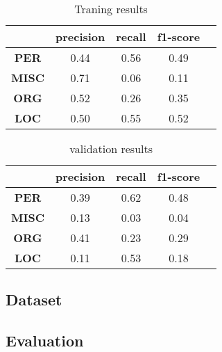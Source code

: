 \begin{table}[ht]
  \centering
  \begin{tabular}{|c|c|c|c|c|}
    \hline
    \textbf{}     & \textbf{precision} & \textbf{recall} & \textbf{f1-score} \\ \hline
    \textbf{PER}  & 0.44               & 0.56            & 0.49              \\
    \textbf{MISC} & 0.71               & 0.06            & 0.11              \\
    \textbf{ORG}  & 0.52               & 0.26            & 0.35              \\
    \textbf{LOC}  & 0.50               & 0.55            & 0.52              \\ \hline
  \end{tabular}
  \caption{Traning results}
  \label{tab:results}
\end{table}



\begin{table}[ht]
  \centering
  \begin{tabular}{|c|c|c|c|c|}
    \hline
    \textbf{}     & \textbf{precision} & \textbf{recall} & \textbf{f1-score} \\ \hline
    \textbf{PER}  & 0.39               & 0.62            & 0.48              \\
    \textbf{MISC} & 0.13               & 0.03            & 0.04              \\
    \textbf{ORG}  & 0.41               & 0.23            & 0.29              \\
    \textbf{LOC}  & 0.11               & 0.53            & 0.18              \\ \hline
  \end{tabular}
  \caption{validation results}
  \label{tab:results_validation}
\end{table}
\subsection{Dataset}
\subsection{Evaluation}
